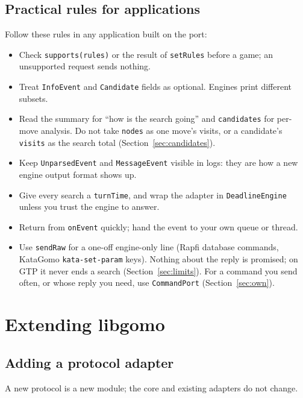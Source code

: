 \documentclass[11pt,a4paper]{article}
\newcommand{\code}[1]{\texttt{#1}}
\begin{document}
\subsection{Practical rules for applications}

Follow these rules in any application built on the port:

\begin{itemize}
  \item Check \code{supports(rules)} or the result of \code{setRules} before a game; an
        unsupported request sends nothing.
  \item Treat \code{InfoEvent} and \code{Candidate} fields as optional. Engines print different
        subsets.
  \item Read the summary for ``how is the search going'' and \code{candidates} for per-move
        analysis. Do not take \code{nodes} as one move's visits, or a candidate's
        \code{visits} as the search total (Section~\ref{sec:candidates}).
  \item Keep \code{UnparsedEvent} and \code{MessageEvent} visible in logs: they are how a new engine
        output format shows up.
  \item Give every search a \code{turnTime}, and wrap the adapter in \code{DeadlineEngine} unless
        you trust the engine to answer.
  \item Return from \code{onEvent} quickly; hand the event to your own queue or thread.
  \item Use \code{sendRaw} for a one-off engine-only line (Rapfi database commands, KataGomo
        \code{kata-set-param} keys). Nothing about the reply is promised; on GTP it never ends a
        search (Section~\ref{sec:limits}). For a command you send often, or whose reply you need,
        use \code{CommandPort} (Section~\ref{sec:own}).
\end{itemize}

\section{Extending libgomo}

\subsection{Adding a protocol adapter}

A new protocol is a new module; the core and existing adapters do not change.
\end{document}
